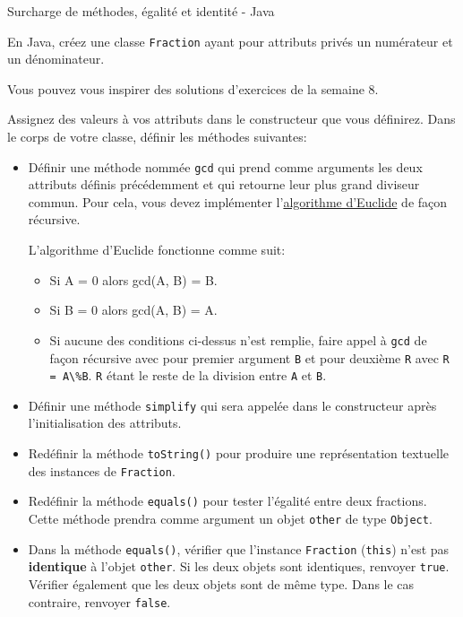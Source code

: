\begin{Exercice}[30 minutes]{Surcharge de méthodes, égalité et identité - Java}

En Java, créez une classe \lstinline{Fraction} ayant pour attributs privés un numérateur et un dénominateur. 
\begin{conseil}
	Vous pouvez vous inspirer des solutions d'exercices de la semaine 8.
\end{conseil}
Assignez des valeurs à vos attributs dans le constructeur que vous définirez. Dans le corps de votre classe, définir les méthodes suivantes:
\begin{itemize}
	\item Définir une méthode nommée \lstinline{gcd} qui prend comme arguments les deux attributs définis précédemment et qui retourne leur plus grand diviseur commun. Pour cela, vous devez implémenter l'\href{https://fr.wikipedia.org/wiki/Algorithme_d%27Euclide#:~:text=le%20code%5D-,Principe}{algorithme d'Euclide} de façon récursive.
	\begin{conseil}
		L'algorithme d'Euclide fonctionne comme suit:
		\begin{itemize}
			\item Si A = 0 alors gcd(A, B) = B.
			\item Si B = 0 alors gcd(A, B) = A.
			\item Si aucune des conditions ci-dessus n'est remplie, faire appel à \lstinline{gcd} de façon récursive avec pour premier argument \lstinline{B} et pour deuxième \lstinline{R} avec \lstinline{R = A\%B}. \lstinline{R} étant le reste de la division entre \lstinline{A} et \lstinline{B}.
		\end{itemize}
	\end{conseil}
	\item Définir une méthode \lstinline{simplify} qui sera appelée dans le constructeur après l'initialisation des attributs. 
	\item Redéfinir la méthode \lstinline{toString()} pour produire une représentation textuelle des instances de \lstinline{Fraction}.
	\item Redéfinir la méthode \lstinline{equals()} pour tester l'égalité entre deux fractions. Cette méthode prendra comme argument un objet \lstinline{other} de type \lstinline{Object}.
	\item Dans la méthode \lstinline{equals()}, vérifier que l'instance \lstinline{Fraction} (\lstinline{this}) n'est pas \textbf{identique} à l'objet \lstinline{other}. Si les deux objets sont identiques, renvoyer \lstinline{true}. Vérifier également que les deux objets sont de même type. Dans le cas contraire, renvoyer \lstinline{false}.

\end{itemize}
\end{Exercice}
